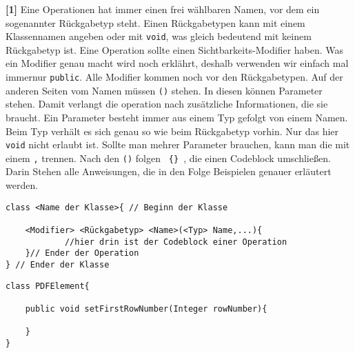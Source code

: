 \begin{enumerate}
          \textbf{[1]} Eine Operationen hat immer einen frei wählbaren Namen, vor dem ein sogenannter Rückgabetyp steht.
          Einen Rückgabetypen kann mit einem Klassennamen angeben oder mit \lstinline{void}, was gleich bedeutend mit keinem      Rückgabetyp ist.
          Eine Operation sollte einen Sichtbarkeits-Modifier haben.
          Was ein Modifier genau macht wird noch erklährt, deshalb verwenden wir einfach mal immernur \lstinline{public}.
          Alle Modifier kommen noch vor den Rückgabetypen.
          Auf der anderen Seiten vom Namen müssen \lstinline{()} stehen.
          In diesen können Parameter stehen. Damit verlangt die operation nach zusätzliche Informationen, die sie braucht. Ein Parameter besteht immer aus einem Typ gefolgt von einem Namen.
          Beim Typ verhält es sich genau so wie beim Rückgabetyp vorhin. Nur das hier \lstinline{void} nicht erlaubt ist.
          Sollte man mehrer Parameter brauchen, kann man die mit einem \lstinline{,} trennen.
          Nach den \lstinline{()} folgen \texttt{ \{\} }, die einen Codeblock umschließen. Darin Stehen alle Anweisungen, die in den Folge Beispielen genauer erläutert werden.

          \begin{lstlisting}[title={\textbf{Klassen Syntax}}]
class <Name der Klasse>{ // Beginn der Klasse

    <Modifier> <Rückgabetyp> <Name>(<Typ> Name,...){
            //hier drin ist der Codeblock einer Operation
    }// Ender der Operation
} // Ender der Klasse
                \end{lstlisting}
          \begin{lstlisting}[title={\textbf{Klassen Beispiel}}]
class PDFElement{
        
    public void setFirstRowNumber(Integer rowNumber){
                
    }                    
}
                                    \end{lstlisting}
          


\end{enumerate}
